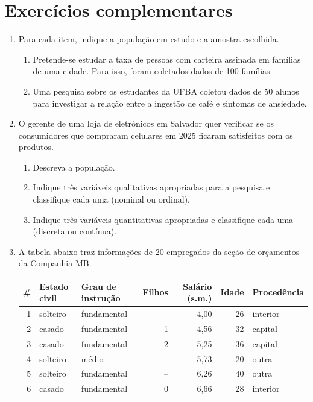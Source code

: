 \documentclass[11pt]{article}
\begin{document}
\bigskip
\section*{Exercícios complementares}

\begin{enumerate}[label=\textbf{C\arabic*.}, leftmargin=*]
\item Para cada item, indique a população em estudo e a amostra escolhida.
\begin{enumerate}[label=(\alph*)]
  \item Pretende-se estudar a taxa de pessoas com carteira assinada em famílias de uma cidade. Para isso, foram coletados dados de 100 famílias.
  \item Uma pesquisa sobre os estudantes da UFBA coletou dados de 50 alunos para investigar a relação entre a ingestão de café e sintomas de ansiedade.
\end{enumerate}
\item O gerente de uma loja de eletrônicos em Salvador quer verificar se os consumidores que compraram celulares em 2025 ficaram satisfeitos com os produtos.
\begin{enumerate}[label=(\alph*)]
  \item Descreva a população.
  \item Indique três variáveis qualitativas apropriadas para a pesquisa e classifique cada uma (nominal ou ordinal).
  \item Indique três variáveis quantitativas apropriadas e classifique cada uma (discreta ou contínua).
\end{enumerate}
\item A tabela abaixo traz informações de 20 empregados da seção de orçamentos da Companhia MB.
\begin{center}\small
\begin{tabular}{rllrrrl}
\toprule
\# & Estado civil & Grau de instrução & Filhos & Salário (s.m.) & Idade & Procedência \\
\midrule
1 & solteiro & fundamental & -- & 4,00 & 26 & interior \\
2 & casado & fundamental & 1 & 4,56 & 32 & capital \\
3 & casado & fundamental & 2 & 5,25 & 36 & capital \\
4 & solteiro & médio & -- & 5,73 & 20 & outra \\
5 & solteiro & fundamental & -- & 6,26 & 40 & outra \\
6 & casado & fundamental & 0 & 6,66 & 28 & interior \\

\end{tabular}
\end{center}
\end{enumerate}
\end{document}
